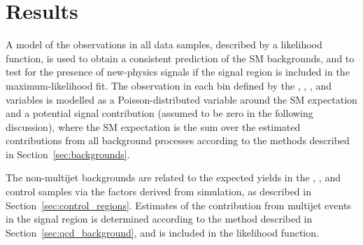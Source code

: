 \section{Results}
\label{sec:result}

A model of the observations in all data samples, described by a
likelihood function, is used to obtain a consistent prediction of the
SM backgrounds, and to test for the presence of new-physics signals if
the signal region is included in the maximum-likelihood fit. The
observation in each bin defined by the \njet, \nb, \scalht, and \HTmiss
variables is modelled as a Poisson-distributed variable around the SM
expectation and a potential signal contribution (assumed to be zero in
the following discussion), where the SM expectation is the sum over
the estimated contributions from all background processes according to
the methods described in Section~\ref{sec:backgrounds}.

The non-multijet backgrounds 
are related to the expected yields in the \mj, \mmj, and \gj control
samples via the \tf factors derived from simulation, as described in
Section~\ref{sec:control_regions}.
Estimates of the contribution from multijet events in the signal
region is determined according to the method described in
Section~\ref{sec:qcd_background}, and is included in the likelihood
function.


